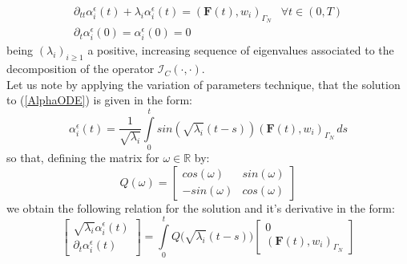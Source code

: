 \begin{enumerate}
    \begin{equation}
        \label{AlphaODE}
        \begin{array}{cc}
            \partial_{tt} \alpha_i^{\epsilon}(t) + \lambda_i \alpha_i^{\epsilon}(t) = (\mathbf{F}(t),w_i)_{\Gamma_N}& \forall t \in (0,T) \\
            \partial_t \alpha_i^{\epsilon}(0) = \alpha_i^{\epsilon}(0) = 0 & 
        \end{array}
    \end{equation}
    being $(\lambda_i)_{i \geq 1}$ a positive, increasing sequence of eigenvalues associated to the decomposition of the operator $\mathcal{I}_C(\cdot, \cdot)$.\\
    Let us note by applying the variation of parameters technique, that the solution to (\ref{AlphaODE}) is given in the form:
    \begin{equation}
        \label{AlphaODEsol}
        \alpha_i^{\epsilon} (t) = \frac{1}{\sqrt{\lambda_i}} \int\limits_0^t sin(\sqrt{\lambda_i} (t-s)) (\mathbf{F}(t),w_i)_{\Gamma_N} \, ds
    \end{equation}
    so that, defining the matrix for $\omega \in \mathbb{R}$ by:
    \begin{equation*}
        Q(\omega) =
        \begin{bmatrix}
        cos(\omega) & sin(\omega) \\
        -sin(\omega) & cos(\omega)
        \end{bmatrix}
    \end{equation*}
    we obtain the following relation for the solution and it's derivative in the form:
    \begin{equation}
        \label{MatrixODEsol}
        \begin{bmatrix}
        \sqrt{\lambda_i} \alpha_i^{\epsilon}(t) \\
        \partial_{t} \alpha_i^{\epsilon}(t) 
        \end{bmatrix}
        = \int \limits_0^t Q\big(\sqrt{\lambda_i}(t-s)\big)
        \begin{bmatrix}
        0 \\
        (\mathbf{F}(t),w_i)_{\Gamma_N}
        \end{bmatrix}
    \end{equation}
    

\end{enumerate}
